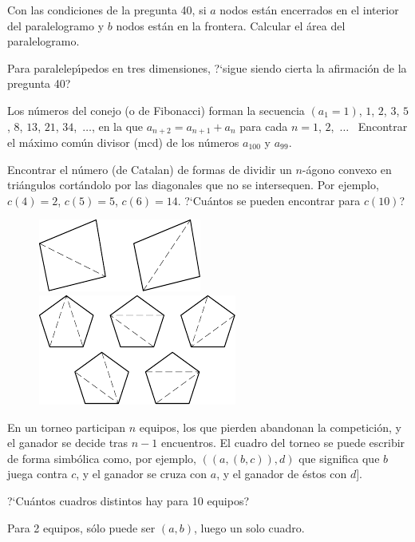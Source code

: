 \documentclass[12pt, spanish]{article}  %
\begin{document}
\medskip
{} Con las condiciones de la pregunta 40, si $a$ nodos est\'an encerrados en el interior del paralelogramo y $b$ nodos est\'an en la frontera. Calcular el \'area del paralelogramo. 

\bigskip
{} Para paralelep\'{\i}pedos en tres dimensiones, ?`sigue siendo cierta la afirmaci\'on de la pregunta 40?

\bigskip
{} Los n\'umeros del conejo (o de Fibonacci) forman la secuencia $(a_1=1)$, $1$, $2$, $3$, $5$, $8$, $13$, $21$,
$34$,\nobreak\ $\dots$, en la que $a_{n+2}=a_{n+1}+a_n$ para cada
$n=1$, $2$,\nobreak\ $\dots$ \   Encontrar el m\'aximo com\'un divisor (mcd) de los n\'umeros $a_{100}$ y $a_{99}$.

\newpage

 Encontrar el n\'umero (de Catalan) de formas de dividir un $n$-\'agono convexo en tri\'angulos cort\'andolo por las diagonales que no se intersequen. 
Por ejemplo, $c(4)=2$, $c(5)=5$, $c(6)=14$. ?`Cu\'antos se pueden encontrar para $c(10)$?
\begin{figure}[h]
\centering
\includegraphics[scale=1]{taskbook-281}
\hskip1cm\includegraphics[scale=1]{taskbook-282}
\end{figure}


\bigskip
{} En un torneo participan $n$ equipos, los que pierden abandonan la competici\'on, y el ganador se decide tras $n-1$ encuentros.
El cuadro del torneo se puede escribir de forma simb\'olica como, por ejemplo,  $((a,(b,c)),d)$ que significa que $b$ juega contra $c$, y el ganador se cruza con $a$, y el ganador de \'estos con $d$].

?`Cu\'antos cuadros distintos hay para 10 equipos? 

Para 2 equipos, s\'olo puede ser $(a,b)$, luego un solo cuadro.
\end{document}
